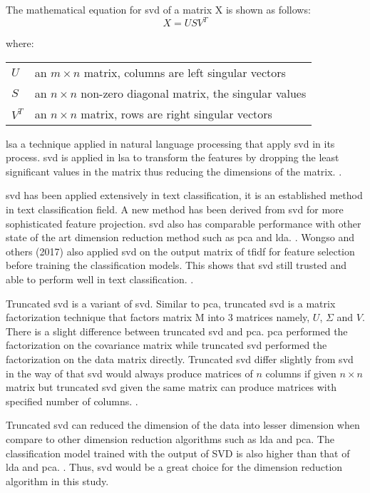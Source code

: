 The mathematical equation for \ac{svd} of a matrix X is shown as follows:
\begin{equation}
X = USV^{T}
\end{equation}

where:
\begin{center}
	\begin{tabular}{l @{ $=$ } l}
		$U$ & an $m \times n$ matrix, columns are left singular vectors \\
		$S$ & an $n \times n$ non-zero diagonal matrix, the singular values \\
		$V^{T}$ & an $n \times n$ matrix, rows are right singular vectors \\
	\end{tabular}
\end{center}

	
\Ac{lsa} a technique applied in natural language processing that apply \ac{svd} in its process. \Ac{svd} is applied in \ac{lsa} to transform the features by dropping the least significant values in the matrix thus reducing the dimensions of the matrix. \cite{fuzzyLash}.

\Ac{svd} has been applied extensively in text classification, it is an established method in text classification field. A new method has been derived from \ac{svd} for more sophisticated feature projection. \Ac{svd} also has comparable performance with other state of the art dimension reduction method such as \ac{pca} and \ac{lda}. \cite{recentReview}. Wongso and others (2017) also applied \ac{svd} on the output matrix of \ac{tfidf} for feature selection before training the classification models. This shows that \ac{svd} still trusted and able to perform well in text classification. \cite{WONGSO2017137}.

Truncated \ac{svd} is a variant of \ac{svd}. Similar to \ac{pca}, truncated \ac{svd} is a matrix factorization technique that factors matrix M into 3 matrices namely, $U$, $\Sigma$ and $V$. There is a slight difference between truncated \ac{svd} and \ac{pca}. \Ac{pca} performed the factorization on the covariance matrix while truncated \ac{svd} performed the factorization on the data matrix directly. Truncated \ac{svd} differ slightly from \ac{svd} in the way of that \ac{svd} would always produce matrices of $n$ columns if given $n \times n$ matrix but truncated \ac{svd} given the same matrix can produce matrices with specified number of columns. \cite{truncatedSVD}.
 
Truncated \ac{svd} can reduced the dimension of the data into lesser dimension when compare to other dimension reduction algorithms such as \ac{lda} and \ac{pca}. The classification model trained with the output of SVD is also higher than that of \ac{lda} and \ac{pca}. \cite{dimRedCat}. Thus, \ac{svd} would be a great choice for the dimension reduction algorithm in this study.\\
	
